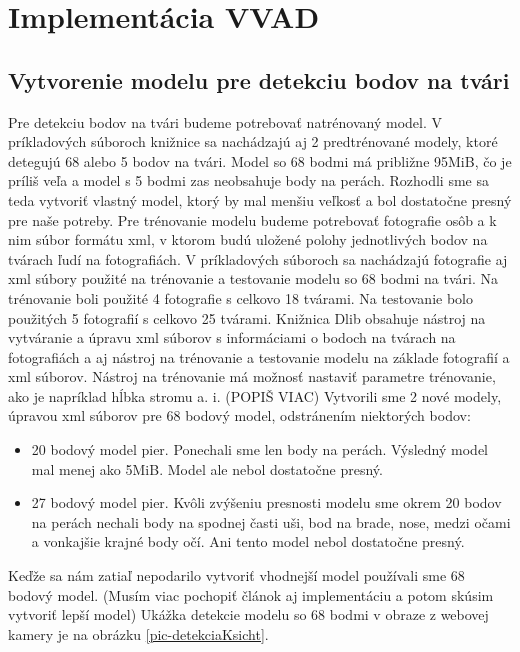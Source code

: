 \section{Implementácia VVAD}

\subsection{Vytvorenie modelu pre detekciu bodov na tvári}
Pre detekciu bodov na tvári budeme potrebovať natrénovaný model. 
V príkladových súboroch knižnice sa nachádzajú aj 2 predtrénované modely, ktoré detegujú 68 alebo 5 bodov na tvári. 
Model so 68 bodmi má približne 95MiB, čo je príliš veľa a model s 5 bodmi zas neobsahuje body na perách.
Rozhodli sme sa teda vytvoriť vlastný model, ktorý by mal menšiu veľkosť a bol dostatočne presný pre naše potreby.
Pre trénovanie modelu budeme potrebovať fotografie osôb a k nim súbor formátu xml, v ktorom budú uložené polohy jednotlivých bodov na tvárach ľudí na fotografiách.
V príkladových súboroch sa nachádzajú fotografie aj xml súbory použité na trénovanie a testovanie modelu so 68 bodmi na tvári.
Na trénovanie boli použité 4 fotografie s celkovo 18 tvárami.
Na testovanie bolo použitých 5 fotografií s celkovo 25 tvárami.
Knižnica Dlib obsahuje nástroj na vytváranie a úpravu xml súborov s informáciami o bodoch na tvárach na fotografiách a aj nástroj na trénovanie a testovanie modelu na základe fotografií a xml súborov.
Nástroj na trénovanie má možnosť nastaviť parametre trénovanie, ako je napríklad hĺbka stromu a. i. (POPIŠ VIAC)
Vytvorili sme 2 nové modely, úpravou xml súborov pre 68 bodový model, odstránením niektorých bodov:
\begin{itemize}
	\item 20 bodový model pier. 
	Ponechali sme len body na perách. 
	Výsledný model mal menej ako 5MiB.
	Model ale nebol dostatočne presný.
	\item 27 bodový model pier.
	Kvôli zvýšeniu presnosti modelu sme okrem 20 bodov na perách nechali body na spodnej časti uši, bod na brade, nose, medzi očami a vonkajšie krajné body očí.
	Ani tento model nebol dostatočne presný.
\end{itemize}

Keďže sa nám zatiaľ nepodarilo vytvoriť vhodnejší model používali sme 68 bodový model.
(Musím viac pochopiť článok aj implementáciu a potom skúsim vytvoriť lepší model)
Ukážka detekcie modelu so 68 bodmi v obraze z webovej kamery je na obrázku \ref{pic-detekciaKsicht}.

